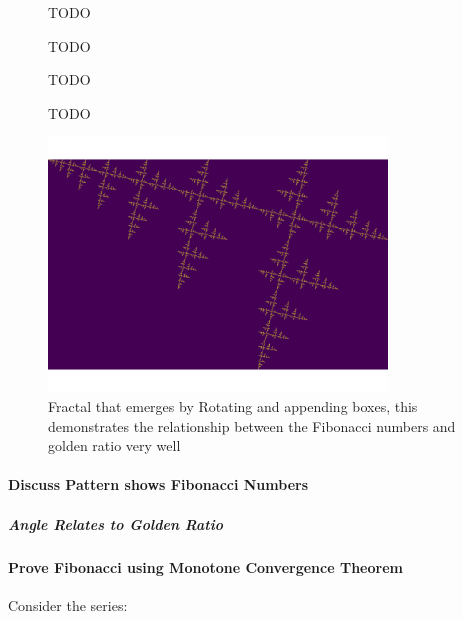 \documentclass[11pt]{article}
\begin{document}
\begin{figure}[htbp]
\centering

\caption{\label{My-Frac-GR}TODO}
\end{figure}

\begin{figure}[htbp]
\centering

\caption{\label{My-Frac-GR}TODO}
\end{figure}

\begin{figure}[htbp]
\centering

\caption{\label{My-Frac-GR}TODO}
\end{figure}

\begin{figure}[htbp]
\centering

\caption{\label{My-Frac-GR}TODO}
\end{figure}

\begin{figure}[htbp]
\centering
\includegraphics[width=9cm]{../Problems/fractal-dimensions/my-self-rep-frac-GR.png}
\caption{\label{My-Frac-GR}Fractal that emerges by Rotating and appending boxes, this demonstrates the relationship between the Fibonacci numbers and golden ratio very well}
\end{figure}

\paragraph{Discuss Pattern shows Fibonacci Numbers}
\label{sec:orgc05afa1}
\subparagraph{Angle Relates to Golden Ratio}
\label{sec:orgae89403}
\paragraph{Prove Fibonacci using Monotone Convergence Theorem}
\label{sec:org86bdbc5}
Consider the series:
\end{document}
